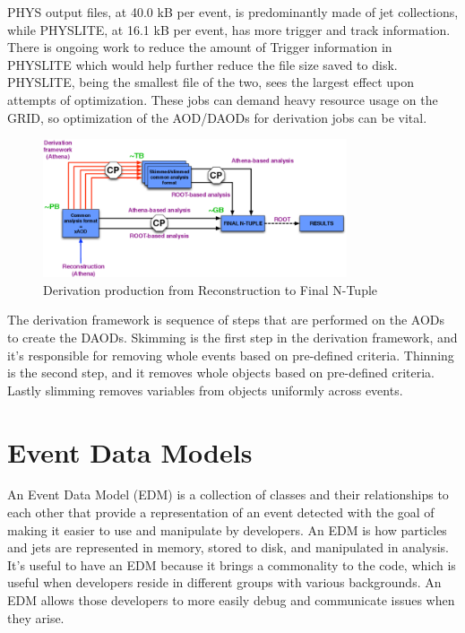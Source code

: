 PHYS output files, at 40.0 kB per event, is predominantly made of jet collections, while PHYSLITE, at 16.1 kB per event, has more trigger and track information.
There is ongoing work to reduce the amount of Trigger information in PHYSLITE which would help further reduce the file size saved to disk.
PHYSLITE, being the smallest file of the two, sees the largest effect upon attempts of optimization. 
These jobs can demand heavy resource usage on the GRID, so optimization of the AOD/DAODs for derivation jobs can be vital. 

\begin{figure}[h]
    \centering
    \includegraphics[width=0.8\textwidth]{content/img/catmore-derivation.png}
    \caption{Derivation production from Reconstruction to Final N-Tuple\cite{DAOD_Laycock_2014}}
    \label{fig:IO_derivation_framework}
\end{figure}

The derivation framework is sequence of steps that are performed on the AODs to create the DAODs.
Skimming is the first step in the derivation framework, and it's responsible for removing whole events based on pre-defined criteria.
Thinning is the second step, and it removes whole objects based on pre-defined criteria.
Lastly slimming removes variables from objects uniformly across events. 


\section{Event Data Models} \label{sec:IO_EDM}
An Event Data Model (EDM) is a collection of classes and their relationships to each other that provide a representation of an event detected with the goal of making it easier to use and manipulate by developers.
An EDM is how particles and jets are represented in memory, stored to disk, and manipulated in analysis.
It's useful to have an EDM because it brings a commonality to the code, which is useful when developers reside in different groups with various backgrounds.
An EDM allows those developers to more easily debug and communicate issues when they arise.  

